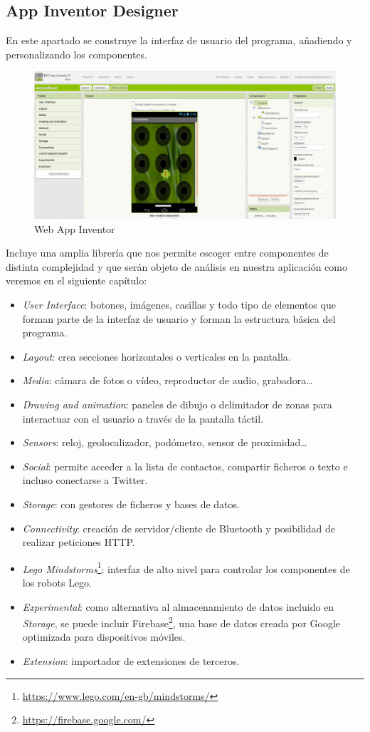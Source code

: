 \documentclass[a4paper, 12pt]{book}
\begin{document}
\subsection{App Inventor Designer} 
En este apartado se construye la interfaz de usuario del programa, añadiendo y personalizando los componentes. 
\begin{figure}[H]
  \centering
  \includegraphics[width=\linewidth, keepaspectratio]{img/appDesigner}
  \caption{Web App Inventor}
  \label{fig:appinventorgallery}
\end{figure}
Incluye una amplia librería que nos permite escoger entre componentes de distinta complejidad y que serán objeto de análisis en nuestra aplicación como veremos en el siguiente capítulo:
\begin{itemize}		
\item \textit{User Interface}: botones, imágenes, casillas y todo tipo de elementos que forman parte de la interfaz de usuario y forman la estructura básica del programa.
\item \textit{Layout}: crea secciones horizontales o verticales en la pantalla. 
\item \textit{Media}: cámara de fotos o vídeo, reproductor de audio, grabadora\ldots 
\item \textit{Drawing and animation}: paneles de dibujo o delimitador de zonas para interactuar con el usuario a través de la pantalla táctil.
\item \textit{Sensors}:	reloj, geolocalizador, podómetro, sensor de proximidad\ldots 
\item \textit{Social}: permite acceder a la lista de contactos, compartir ficheros o texto e incluso conectarse a Twitter. 
\item \textit{Storage}:	con gestores de ficheros y bases de datos.
\item \textit{Connectivity}: creación de servidor/cliente de Bluetooth y posibilidad de realizar peticiones HTTP.	
\item \textit{Lego Mindstorms}\footnote{\url{https://www.lego.com/en-gb/mindstorms/}}: interfaz de alto nivel para controlar los componentes de los robots Lego.
\item \textit{Experimental}: como alternativa al almacenamiento de datos incluido en \textit{Storage}, se puede incluir Firebase\footnote{\url{https://firebase.google.com/}}, una base de datos creada por Google optimizada para dispositivos móviles.
\item \textit{Extension}: importador de extensiones de terceros. 
\end{itemize}
\end{document}

